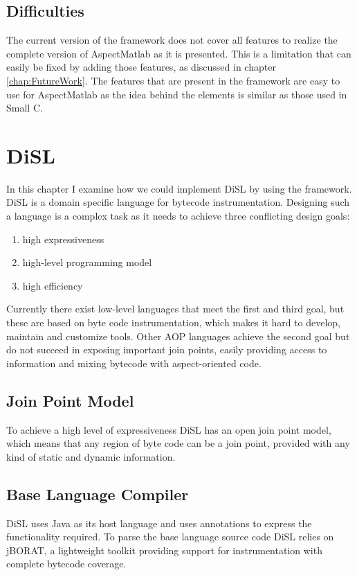 \documentclass[a4paper]{report}
\begin{document}
\section{Difficulties}
The current version of the framework does not cover all features to realize the complete version of AspectMatlab as it is presented. This is a limitation that can easily be fixed by adding those features, as discussed in chapter \ref{chap:FutureWork}. The features that are present in the framework are easy to use for AspectMatlab as the idea behind the elements is similar as those used in Small C.

\chapter{DiSL}
\label{chap:DiSL}
In this chapter I examine how we could implement DiSL by using the framework. DiSL \citep{marek_disl:_2012} is a domain specific language for bytecode instrumentation. Designing such a language is a complex task as it needs to achieve three conflicting design goals:
\begin{enumerate}
\item high expressiveness
\item high-level programming model
\item high efficiency
\end{enumerate}
Currently there exist low-level languages that meet the first and third goal, but these are based on byte code instrumentation, which makes it hard to develop, maintain and customize tools. Other AOP languages achieve the second goal but do not succeed in exposing important join points, easily providing access to information and mixing bytecode with aspect-oriented code.

\section{Join Point Model}
To achieve a high level of expressiveness DiSL has an open join point model, which means that any region of byte code can be a join point, provided with any kind of static and dynamic information.

\section{Base Language Compiler}
DiSL uses Java as its host language and uses annotations to express the functionality required. To parse the base language source code DiSL relies on jBORAT, a lightweight toolkit providing support for instrumentation with complete bytecode coverage.
\end{document}
